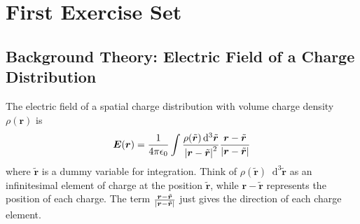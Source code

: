 \documentclass[11pt, a4paper]{article}
\newcommand{\diff}{\mathop{}\!\mathrm{d}} %
\renewcommand{\vec}[1]{\bm{#1}} %
\newcommand{\tvec}[1]{\tilde{\vec{#1}}} %
\renewcommand{\r}{\vec{r}}
\newcommand{\ee}{\epsilon_{0}}  %
\begin{document}
\newpage

\tableofcontents

\newpage


\section{First Exercise Set}

\subsection{Background Theory: Electric Field of a Charge Distribution}
The electric field of a spatial charge distribution with volume charge density $ \rho(\r) $ is
\begin{equation*}
	\vec{E}(\vec{r}) = \frac{1}{4\pi \ee}\int \frac{\rho(\tvec{r}) \diff^{3}\tvec{r} }{\abs{\vec{r} - \tvec{r}}^{2}} \frac{\vec{r} - \tvec{r}}{\abs{\vec{r} - \tvec{r}}}
\end{equation*}
where $ \tvec{r} $ is a dummy variable for integration. Think of $ \rho(\tvec{r}) \diff^{3}\tvec{r} $ as an infinitesimal element of charge at the position $ \tvec{r} $, while $ \vec{r} - \tvec{r} $ represents the position of each charge. The term $ \frac{\vec{r} - \tvec{r}}{\abs{\vec{r} - \tvec{r}}} $ just gives the direction of each charge element.
\end{document}
